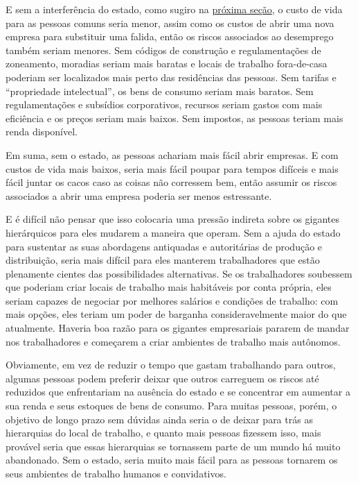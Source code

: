 E sem a interferência do estado, como sugiro na \hyperref[sec:1]{próxima seção}, o custo de vida para as pessoas comuns seria menor, assim como os custos de abrir uma nova empresa para substituir uma falida, então os riscos associados ao desemprego também seriam menores. Sem códigos de construção e regulamentações de zoneamento, moradias seriam mais baratas e locais de trabalho fora-de-casa poderiam ser localizados mais perto das residências das pessoas. Sem tarifas e ``propriedade intelectual'', os bens de consumo seriam mais baratos. Sem regulamentações e subsídios corporativos, recursos seriam gastos com mais eficiência e os preços seriam mais baixos. Sem impostos, as pessoas teriam mais renda disponível.

Em suma, sem o estado, as pessoas achariam mais fácil abrir empresas. E com custos de vida mais baixos, seria mais fácil poupar para tempos difíceis e mais fácil juntar os cacos caso as coisas não corressem bem, então assumir os riscos associados a abrir uma empresa poderia ser menos estressante. 

E é difícil não pensar que isso colocaria uma pressão indireta sobre os gigantes hierárquicos para eles mudarem a maneira que operam. Sem a ajuda do estado para sustentar as suas abordagens antiquadas e autoritárias de produção e distribuição, seria mais difícil para eles manterem trabalhadores que estão plenamente cientes das possibilidades alternativas. Se os trabalhadores soubessem que poderiam criar locais de trabalho mais habitáveis por conta própria, eles seriam capazes de negociar por melhores salários e condições de trabalho: com mais opções, eles teriam um poder de barganha consideravelmente maior do que atualmente. Haveria boa razão para os gigantes empresariais pararem de mandar nos trabalhadores e começarem a criar ambientes de trabalho mais autônomos.

Obviamente, em vez de reduzir o tempo que gastam trabalhando para outros, algumas pessoas podem preferir deixar que outros carreguem os riscos até reduzidos que enfrentariam na ausência do estado e se concentrar em aumentar a sua renda e seus estoques de bens de consumo. Para muitas pessoas, porém, o objetivo de longo prazo sem dúvidas ainda seria o de deixar para trás as hierarquias do local de trabalho, e quanto mais pessoas fizessem isso, mais provável seria que essas hierarquias se tornassem parte de um mundo há muito abandonado. Sem o estado, seria muito mais fácil para as pessoas tornarem os seus ambientes de trabalho humanos e convidativos.

